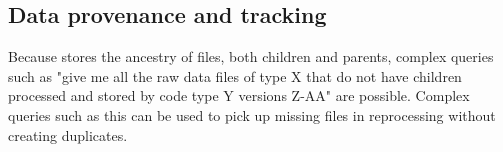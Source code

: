 \documentclass[../main-v1.tex]{subfiles}
\begin{document}












\subsection{Data provenance and tracking}\label{sec:prov}
Because  stores the ancestry of files, both children and parents, complex queries such as "give me all the raw data files of type X that do not have children processed and stored by code type Y versions Z-AA" are possible.  Complex queries such as this can be used to pick up missing files in reprocessing without creating duplicates. 
\end{document}
